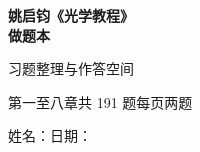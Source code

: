 \documentclass[UTF8,a4paper,12pt,oneside,openany,fontset=fandol]{ctexbook}
\begin{document}
\begin{titlepage}
  \centering
  \vspace*{.24\textheight}
  {\Huge\bfseries 姚启钧《光学教程》\\[0.6em]做题本\par}
  \vspace{1.8cm}
  {\Large 习题整理与作答空间\par}
  \vspace{0.8cm}
  {\large 第一至八章\quad 共 191 题\quad 每页两题\par}
  \vfill
  {\large 姓名：\underline{\hspace{4cm}}\quad 日期：\underline{\hspace{3cm}}\par}
\end{titlepage}

\frontmatter
\tableofcontents
\clearpage

\mainmatter








\end{document}
